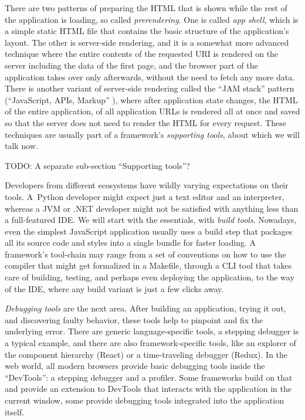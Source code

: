 \documentclass[english,odsaz]{fitthesis}
\begin{document}
There are two patterns of preparing the HTML that is shown while the rest of the
application is loading, so called \emph{prerendering}. One is called \emph{app shell}, which
is a simple static HTML file that contains the basic structure of the
application's layout. The other is server-side rendering, and it is a somewhat
more advanced technique where the entire contents of the requested URI is
rendered on the server including the data of the first page, and the browser
part of the application takes over only afterwards, without the need to fetch
any more data. There is another variant of server-side rendering called the ``JAM
stack'' pattern (``JavaScript, APIs, Markup'' \cite{jamstack}), where after
application state changes, the HTML of the entire application, of all
application URLs is rendered all at once and saved so that the server does not
need to render the HTML for every request. These techniques are usually part of
a framework's \emph{supporting tools}, about which we will talk now.

TODO: A separate sub-section ``Supporting tools''?

Developers from different ecosystems have wildly varying expectations on their
tools. A~Python developer might expect just a text editor and an
interpreter, whereas a JVM or .NET developer might not be satisfied with
anything less than a full-featured IDE. We will start with the essentials, with
\emph{build tools}. Nowadays, even the simplest JavaScript application usually uses a
build step that packages all its source code and styles into a single bundle for
faster loading. A framework's tool-chain may range from a set of conventions on
how to use the compiler that might get formalized in a Makefile, through a CLI
tool that takes care of building, testing, and perhaps even deploying the
application, to the way of the IDE, where any build variant is just a few clicks
away.

\emph{Debugging tools} are the next area. After building an application, trying it out,
and discovering faulty behavior, these tools help to pinpoint and fix the
underlying error. There are generic language-specific tools, a stepping debugger
is a typical example, and there are also framework-specific tools, like an
explorer of the component hierarchy (React) or a time-traveling debugger
(Redux). In the web world, all modern browsers provide basic debugging tools
inside the ``DevTools'': a stepping debugger and a profiler. Some frameworks build
on that and provide an extension to DevTools that interacts with the application
in the current window, some provide debugging tools integrated into the
application itself.
\end{document}
